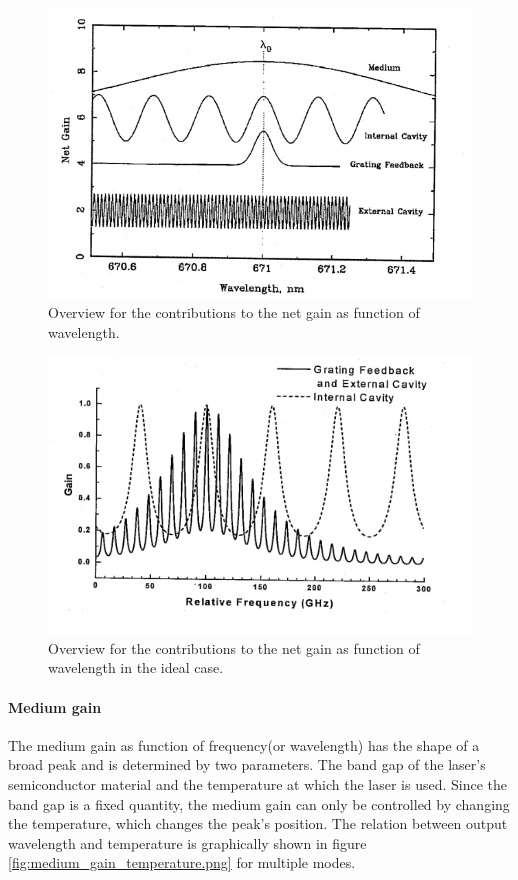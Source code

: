 \FloatBarrier
\begin{figure}
  \includegraphics{gain_overview.png}
  \caption{Overview for the contributions to the net gain as function of
            wavelength.\cite{sample}}
  \label{fig:gain_overview}
\end{figure}
\FloatBarrier

\FloatBarrier
\begin{figure}
  \includegraphics{ideal_gain_overview.png}
  \caption{Overview for the contributions to the net gain as function of
            wavelength in the ideal case.\cite{sample}}
  \label{fig:ideal_gain_overview}
\end{figure}
\FloatBarrier


\paragraph{Medium gain}
The medium gain as function of frequency(or wavelength) has
the shape of a broad peak and is determined by two parameters.
The band gap of the laser's semiconductor material and the temperature
at which the laser is used. Since the band gap is a fixed
quantity, the medium gain can only be controlled by changing
the temperature, which changes the peak's position.
The relation between output wavelength and
temperature is graphically shown
in figure \ref{fig:medium_gain_temperature.png}
for multiple modes.



